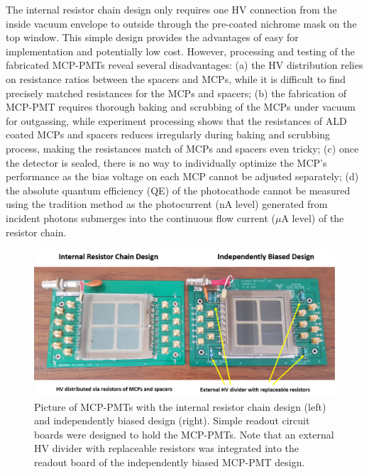 \documentclass[preprint,5p]{elsarticle}
\begin{document}
The internal resistor chain design only requires one HV connection from the 
inside vacuum envelope to outside through the pre-coated nichrome mask on the 
top window. This simple design provides the advantages of easy for 
implementation and potentially low cost. However, processing and testing of the 
fabricated MCP-PMTs reveal several disadvantages: (a) the HV distribution 
relies on resistance ratios between the spacers and MCPs, while it is difficult 
to find precisely matched resistances for the MCPs and spacers; (b) the 
fabrication of MCP-PMT requires thorough baking and scrubbing of the MCPs under 
vacuum for outgassing, while experiment processing shows that the resistances 
of ALD coated MCPs and spacers reduces irregularly during baking and scrubbing 
process, making the resistances match of MCPs and spacers even tricky; (c) once 
the detector is sealed, there is no way to individually optimize the MCP’s 
performance as the bias voltage on each MCP cannot be adjusted separately; (d) 
the absolute quantum efficiency (QE) of the photocathode cannot be measured 
using the tradition method as the photocurrent (nA level) generated from 
incident photons submerges into the continuous flow current ($\mu$A level) of 
the resistor chain.      

\begin{figure}[tbp]
\centering \includegraphics[scale=1.1]{fig/DDlRDV.png}
 \caption{Picture of MCP-PMTs with the internal resistor chain design (left) 
   and independently biased design (right). Simple readout circuit boards were 
   designed to hold the MCP-PMTs. Note that an external HV divider with 
   replaceable resistors was integrated into the readout board of the 
   independently biased MCP-PMT design. } \label{fig:design}
\end{figure}
\end{document}
